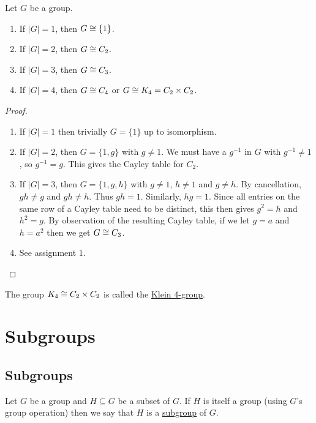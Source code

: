 \documentclass[11pt]{article}
\begin{document}
\begin{proposition}
    Let $G$ be a group.
    \begin{enumerate}
        \item If $|G|=1$, then $G\cong\{1\}$.
        \item If $|G|=2$, then $G\cong C_2$.
        \item If $|G|=3$, then $G\cong C_3$.
        \item If $|G|=4$, then $G\cong C_4$ or $G\cong K_4=C_2\times C_2$.
    \end{enumerate}
\end{proposition}

\begin{proof}\,
\begin{enumerate}
    \item If $|G|=1$ then trivially $G=\{1\}$ up to isomorphism.
    \item If $|G|=2$, then $G=\{1,g\}$ with $g\neq 1$. We must have a $g^{-1}$ in $G$ with $g^{-1}\neq 1$, so $g^{-1}=g$. This gives the Cayley table for $C_2$.
    \item If $|G|=3$, then $G=\{1,g,h\}$ with $g\neq 1$, $h\neq1$ and $g\neq h$. By cancellation, $gh\neq g$ and $gh\neq h$. Thus $gh=1$. Similarly, $hg=1$. Since all entries on the same row of a Cayley table need to be distinct, this then gives $g^2=h$ and $h^2=g$. By observation of the resulting Cayley table, if we let $g=a$ and $h=a^2$ then we get $G\cong C_3$.
    \item See assignment 1.
\end{enumerate}
\end{proof}

\begin{definition}
    The group $K_4\cong C_2\times C_2$ is called the \ul{Klein 4-group}.
\end{definition}

\section{Subgroups}

\subsection{Subgroups}

\begin{definition}[Subgroups]
    Let $G$ be a group and $H\subseteq G$ be a subset of $G$. If $H$ is itself a group (using $G$'s group operation) then we say that $H$ is a \ul{subgroup} of $G$.
\end{definition}
\end{document}
